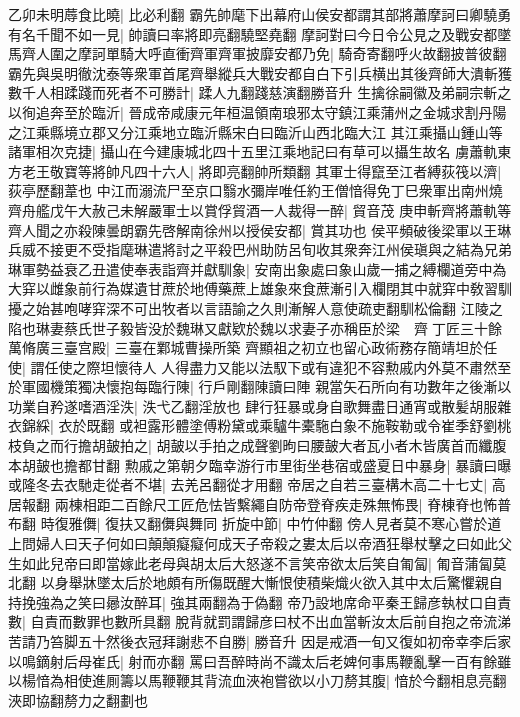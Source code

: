 乙卯未明蓐食比曉|{
	比必利翻}
霸先帥麾下出幕府山侯安都謂其部將蕭摩訶曰卿驍勇有名千聞不如一見|{
	帥讀曰率將即亮翻驍堅堯翻}
摩訶對曰今日令公見之及戰安都墜馬齊人圍之摩訶單騎大呼直衝齊軍齊軍披靡安都乃免|{
	騎奇寄翻呼火故翻披普彼翻}
霸先與吳明徹沈泰等衆軍首尾齊舉縱兵大戰安都自白下引兵横出其後齊師大潰斬獲數千人相蹂踐而死者不可勝計|{
	蹂人九翻踐慈演翻勝音升}
生擒徐嗣徽及弟嗣宗斬之以徇追奔至於臨沂|{
	晉成帝咸康元年桓温領南琅邪太守鎮江乘蒲州之金城求割丹陽之江乘縣境立郡又分江乘地立臨沂縣宋白曰臨沂山西北臨大江}
其江乘攝山鍾山等諸軍相次克捷|{
	攝山在今建康城北四十五里江乘地記曰有草可以攝生故名}
虜蕭軌東方老王敬寶等將帥凡四十六人|{
	將即亮翻帥所類翻}
其軍士得竄至江者縛荻筏以濟|{
	荻亭歷翻葦也}
中江而溺流尸至京口翳水彌岸唯任約王僧愔得免丁巳衆軍出南州燒齊舟艦戊午大赦己未解嚴軍士以賞俘貿酒一人裁得一醉|{
	貿音茂}
庚申斬齊將蕭軌等齊人聞之亦殺陳曇朗霸先啓解南徐州以授侯安都|{
	賞其功也}
侯平頻破後梁軍以王琳兵威不接更不受指麾琳遣將討之平殺巴州助防呂旬收其衆奔江州侯瑱與之結為兄弟琳軍勢益衰乙丑遣使奉表詣齊并獻馴象|{
	安南出象處曰象山歲一捕之縛欄道旁中為大穽以雌象前行為媒遺甘蔗於地傅藥蔗上雄象來食蔗漸引入欄閉其中就穽中敎習馴擾之始甚咆哮穽深不可出牧者以言語諭之久則漸解人意使疏吏翻馴松倫翻}
江陵之陷也琳妻蔡氏世子毅皆没於魏琳又獻欵於魏以求妻子亦稱臣於梁　齊丁匠三十餘萬脩廣三臺宫殿|{
	三臺在鄴城曹操所築}
齊顯祖之初立也留心政術務存簡靖坦於任使|{
	謂任使之際坦懷待人}
人得盡力又能以法馭下或有違犯不容勲戚内外莫不肅然至於軍國機策獨决懷抱每臨行陳|{
	行戶剛翻陳讀曰陣}
親當矢石所向有功數年之後漸以功業自矜遂嗜酒淫泆|{
	泆弋乙翻淫放也}
肆行狂暴或身自歌舞盡日通宵或散髪胡服雜衣錦綵|{
	衣於既翻}
或袒露形體塗傅粉黛或乘驢牛橐駞白象不施鞍勒或令崔季舒劉桃枝負之而行擔胡皷拍之|{
	胡皷以手拍之成聲劉昫曰腰皷大者瓦小者木皆廣首而纖腹本胡皷也擔都甘翻}
勲戚之第朝夕臨幸游行市里街坐巷宿或盛夏日中暴身|{
	暴讀曰曝}
或隆冬去衣馳走從者不堪|{
	去羌呂翻從才用翻}
帝居之自若三臺構木高二十七丈|{
	高居報翻}
兩棟相距二百餘尺工匠危怯皆繫繩自防帝登脊疾走殊無怖畏|{
	脊棟脊也怖普布翻}
時復雅儛|{
	復扶又翻儛與舞同}
折旋中節|{
	中竹仲翻}
傍人見者莫不寒心嘗於道上問婦人曰天子何如曰顛顛癡癡何成天子帝殺之婁太后以帝酒狂舉杖擊之曰如此父生如此兒帝曰即當嫁此老母與胡太后大怒遂不言笑帝欲太后笑自匍匐|{
	匍音蒲匐莫北翻}
以身舉牀墜太后於地頗有所傷既醒大慚恨使積柴熾火欲入其中太后驚懼親自持挽強為之笑曰曏汝醉耳|{
	強其兩翻為于偽翻}
帝乃設地席命平秦王歸彦執杖口自責數|{
	自責而數罪也數所具翻}
脫背就罰謂歸彦曰杖不出血當斬汝太后前自抱之帝流涕苦請乃笞脚五十然後衣冠拜謝悲不自勝|{
	勝音升}
因是戒酒一旬又復如初帝幸李后家以鳴鏑射后母崔氏|{
	射而亦翻}
罵曰吾醉時尚不識太后老婢何事馬鞭亂擊一百有餘雖以楊愔為相使進厠籌以馬鞭鞭其背流血浹袍嘗欲以小刀剺其腹|{
	愔於今翻相息亮翻浹即協翻剺力之翻劃也}
